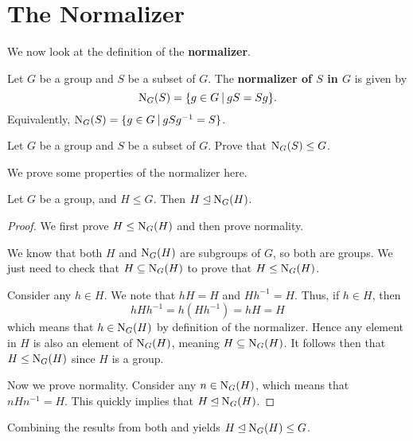 \section{The Normalizer}
We now look at the definition of the \textbf{normalizer}.
\begin{definition}
    Let $G$ be a group and $S$ be a subset of $G$. The \textbf{normalizer of $S$ in $G$} is given by
    \[
        \N{G}{S} = \{g \in G \vert gS = Sg \}.
    \]
    Equivalently, $\N{G}{S} = \{g \in G \vert gSg^{-1} = S \}$.
\end{definition}
\begin{exercise}\label{exercise-normalizer-is-subgroup-of-main-group}
    Let $G$ be a group and $S$ be a subset of $G$. Prove that $\mathrm{N}_{G}(S) \leq G$.
\end{exercise}

We prove some properties of the normalizer here.
\begin{proposition}\label{prop-subgroup-is-a-normal-subgroup-of-normalizer}
    Let $G$ be a group, and $H \leq G$. Then $H \unlhd \mathrm{N}_{G}(H)$.
\end{proposition}
\begin{proof}
    We first prove $H \leq \mathrm{N}_{G}(H)$ and then prove normality.

    We know that both $H$ and $\mathrm{N}_{G}(H)$ are subgroups of $G$, so both are groups. We just need to check that $H \subseteq \mathrm{N}_{G}(H)$ to prove that $H \leq \mathrm{N}_{G}(H)$.

    Consider any $h \in H$. We note that $hH = H$ and $Hh^{-1} = H$. Thus, if $h \in H$, then
    \[
        hHh^{-1} = h(Hh^{-1}) = hH = H
    \]
    which means that $h \in \mathrm{N}_{G}(H)$ by definition of the normalizer. Hence any element in $H$ is also an element of $\mathrm{N}_{G}(H)$, meaning $H \subseteq \mathrm{N}_{G}(H)$. It follows then that $H \leq \mathrm{N}_{G}(H)$ since $H$ is a group.

    Now we prove normality. Consider any $n \in \mathrm{N}_{G}(H)$, which means that $nHn^{-1} = H$. This quickly implies that $H \unlhd \mathrm{N}_{G}(H)$.
\end{proof}
\begin{remark}
    Combining the results from both  and  yields $H \unlhd \mathrm{N}_{G}(H) \leq G$.
\end{remark}

